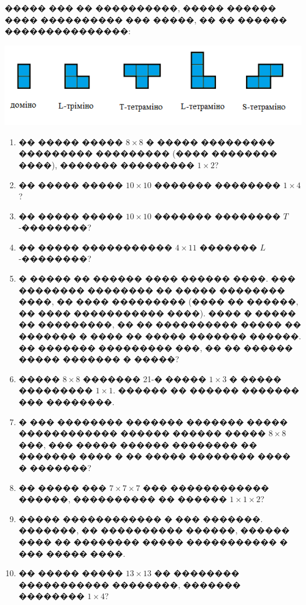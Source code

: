 \documentclass[a4paper,12pt]{article}
\begin{document}
\medskip

����� ��� �� ����������, ����� ������ ���� ���������� ��� �����, �� �� ������ ���������������:

\medskip

\begin{center}
\includegraphics[scale=1]{tilings.png}
\end{center}

\medskip

\begin{enumerate}
\item �� ����� ����� $8\times 8$ � ����� ��������� ��������� ��������� (���� �������� ����), ������� ��������� $1\times 2$?

\item �� ����� ����� $10\times 10$ ������� �������� $1\times 4$?

\item �� ����� ����� $10\times 10$ ������� �������� $T$-��������?

\item �� ����� ����������� $4\times 11$ ������� $L$-��������?

\item � ����� �� ������ ���� ������ ����. ��� �������� �������� �� ����� �������� ����, �� ���� ��������� (���� �� ������, �� ���� ����������� ����). ���� � ����� �� ���������, �� �� ���������� ����� �� ������� � ���� �� ����� ������� ������. �� ������� ��������� ���, �� �� ������ ����� ������� � �����?

\item ����� $8\times 8$ ������� 21-� ����� $1\times 3$ � ����� ��������� $1\times 1$. ������ �� ������ ������� ��� ��������.

\item � ��� �������� ������� ������� ����� ������������ ������ ������ ����� $8\times 8$ ���, ��� ����� ������ �������� �� ������� ���� � �� ����� �������� ���� � �������?

\item �� ����� ��� $7\times 7 \times 7$ ��� ������������ ������, ���������� �� ������ $1\times 1\times 2$?

\item ����� ������������ � ��� �������. �������, �� ���������� ������, ������ ���� �� �������� ����� ����������� � ��� ����� ����.

\item �� ����� ����� $13\times 13$ �� �������� ����������� ��������, ������� �������� $1\times 4$?
\end{enumerate}
\end{document}
